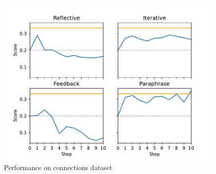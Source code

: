 \begin{figure}
    \label{fig:connections}
    \includegraphics[width=\linewidth]{connections.pdf}
    \caption{Performance on connections dataset}
\end{figure}

